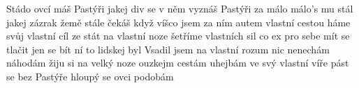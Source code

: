\begin{TEXT}{Stádo}
\REFREN  {}  ovcí máš \NL
Pastýři jakej div  se v něm vyznáš \NL
Pastýři za málo  málo's mu stál \NL
jakej zázrak žemě stále čekáš \NL
když víšco jsem za 
\SLOKA {}ním autem vlastní cestou \NL
{}háme svůj vlastní cíl \NL
{}ze stát na vlastní noze \NL
{}šetříme vlastních sil \NL
{}co ex pro sebe mít \NL
{} se tlačit jen se bít \NL
{}ní to lidskej  byl 
\SLOKA Vsadil jsem na vlastní rozum \NL
nic nenechám náhodám \NL
žiju si na velký noze \NL
ouzkejm cestám uhejbám \NL
ve svý vlastní víře \NL
pást se bez Pastýře \NL
hloupý se ovci podobám
\end{TEXT}
